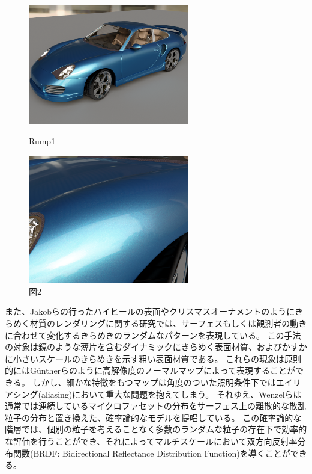 \begin{figure}[htbp]
 \begin{minipage}{0.4\hsize}
  \begin{center}
   \includegraphics[width=70mm]{./img/porsche01.png}
  \end{center}
  \caption{Rump1}
  \label{FRump1}
 \end{minipage}
 \begin{minipage}{0.75\hsize}
  \begin{center}
    \includegraphics[width=70mm]{./img/porsche03.png}
  \end{center}
  \caption{図2}
  \label{FRump2}
 \end{minipage}
\end{figure}

\noindent
また、Jakobら\cite{jakob2014discrete}の行ったハイヒールの表面やクリスマスオーナメントのようにきらめく材質のレンダリングに関する研究では、サーフェスもしくは観測者の動きに合わせて変化するきらめきのランダムなパターンを表現している。
この手法の対象は鏡のような薄片を含むダイナミックにきらめく表面材質、およびかすかに小さいスケールのきらめきを示す粗い表面材質である。
これらの現象は原則的にはG\"{u}ntherらのように高解像度のノーマルマップによって表現することができる。
しかし、細かな特徴をもつマップは角度のついた照明条件下ではエイリアシング(aliasing)において重大な問題を抱えてしまう。
それゆえ、Wenzelらは通常では連続しているマイクロファセットの分布をサーフェス上の離散的な散乱粒子の分布と置き換えた、確率論的なモデルを提唱している。
この確率論的な階層では、個別の粒子を考えることなく多数のランダムな粒子の存在下で効率的な評価を行うことができ、それによってマルチスケールにおいて双方向反射率分布関数(BRDF: Bidirectional Reflectance Distribution Function)を導くことができる。

